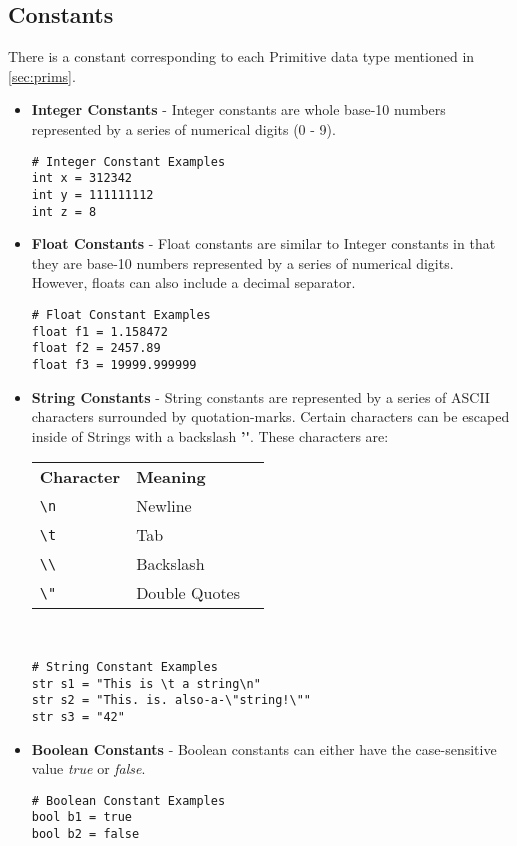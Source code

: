 \documentclass{article}
\begin{document}
\subsection{Constants}
There is a constant corresponding to each Primitive data type mentioned in \ref{sec:prims}.

\begin{itemize}
\item \textbf{Integer Constants} - Integer constants are whole base-10 numbers represented by a series of numerical digits (0 - 9). 
\begin{lstlisting}
# Integer Constant Examples
int x = 312342
int y = 111111112
int z = 8
\end{lstlisting}

\item \textbf{Float Constants} - Float constants are similar to Integer constants in that they are base-10 numbers represented by a series of numerical digits. However, floats can also include a decimal separator.
\begin{lstlisting}
# Float Constant Examples
float f1 = 1.158472
float f2 = 2457.89
float f3 = 19999.999999
\end{lstlisting}

\item \textbf{String Constants} - String constants are represented by a series of ASCII characters surrounded by quotation-marks. Certain characters can be escaped inside of Strings with a backslash \textbf{'\'}. These characters are:

\begin{tabular}{ l | l | l }
\textbf{Character} & \textbf{Meaning} \\
\texttt{\textbackslash n } & Newline \\
\texttt{\textbackslash t} & Tab \\
\texttt{\textbackslash  \textbackslash} & Backslash \\
\texttt{\textbackslash " } & Double Quotes \\
\end{tabular}
\\
\begin{lstlisting}
# String Constant Examples
str s1 = "This is \t a string\n"
str s2 = "This. is. also-a-\"string!\""
str s3 = "42"
\end{lstlisting}

\item \textbf{Boolean Constants} - Boolean constants can either have the case-sensitive value \emph{true} or \emph{false}.
\begin{lstlisting}
# Boolean Constant Examples
bool b1 = true
bool b2 = false
\end{lstlisting}

\end{itemize}
\end{document}
